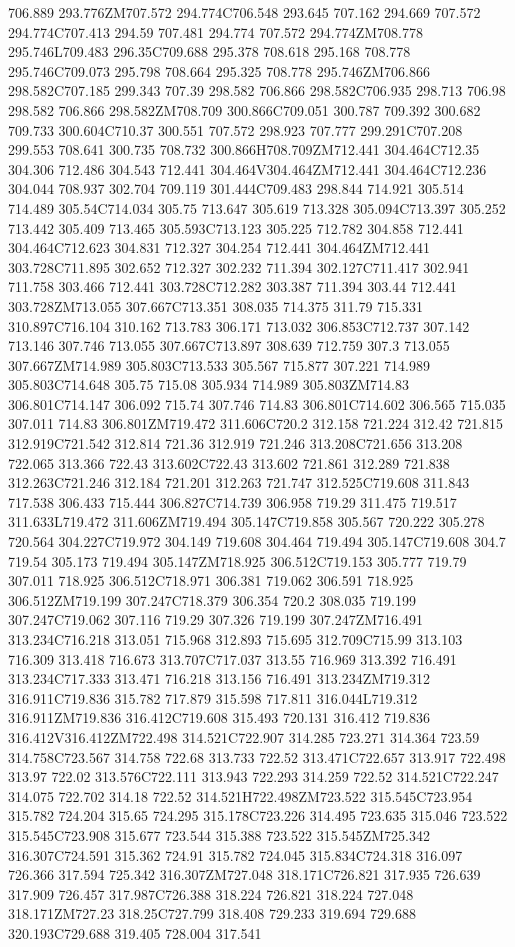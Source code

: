 706.889 293.776ZM707.572 294.774C706.548 293.645 707.162 294.669 707.572 294.774C707.413 294.59 707.481 294.774 707.572 294.774ZM708.778 295.746L709.483 296.35C709.688 295.378 708.618 295.168 708.778 295.746C709.073 295.798 708.664 295.325 708.778 295.746ZM706.866 298.582C707.185 299.343 707.39 298.582 706.866 298.582C706.935 298.713 706.98 298.582 706.866 298.582ZM708.709 300.866C709.051 300.787 709.392 300.682 709.733 300.604C710.37 300.551 707.572 298.923 707.777 299.291C707.208 299.553 708.641 300.735 708.732 300.866H708.709ZM712.441 304.464C712.35 304.306 712.486 304.543 712.441 304.464V304.464ZM712.441 304.464C712.236 304.044 708.937 302.704 709.119 301.444C709.483 298.844 714.921 305.514 714.489 305.54C714.034 305.75 713.647 305.619 713.328 305.094C713.397 305.252 713.442 305.409 713.465 305.593C713.123 305.225 712.782 304.858 712.441 304.464C712.623 304.831 712.327 304.254 712.441 304.464ZM712.441 303.728C711.895 302.652 712.327 302.232 711.394 302.127C711.417 302.941 711.758 303.466 712.441 303.728C712.282 303.387 711.394 303.44 712.441 303.728ZM713.055 307.667C713.351 308.035 714.375 311.79 715.331 310.897C716.104 310.162 713.783 306.171 713.032 306.853C712.737 307.142 713.146 307.746 713.055 307.667C713.897 308.639 712.759 307.3 713.055 307.667ZM714.989 305.803C713.533 305.567 715.877 307.221 714.989 305.803C714.648 305.75 715.08 305.934 714.989 305.803ZM714.83 306.801C714.147 306.092 715.74 307.746 714.83 306.801C714.602 306.565 715.035 307.011 714.83 306.801ZM719.472 311.606C720.2 312.158 721.224 312.42 721.815 312.919C721.542 312.814 721.36 312.919 721.246 313.208C721.656 313.208 722.065 313.366 722.43 313.602C722.43 313.602 721.861 312.289 721.838 312.263C721.246 312.184 721.201 312.263 721.747 312.525C719.608 311.843 717.538 306.433 715.444 306.827C714.739 306.958 719.29 311.475 719.517 311.633L719.472 311.606ZM719.494 305.147C719.858 305.567 720.222 305.278 720.564 304.227C719.972 304.149 719.608 304.464 719.494 305.147C719.608 304.7 719.54 305.173 719.494 305.147ZM718.925 306.512C719.153 305.777 719.79 307.011 718.925 306.512C718.971 306.381 719.062 306.591 718.925 306.512ZM719.199 307.247C718.379 306.354 720.2 308.035 719.199 307.247C719.062 307.116 719.29 307.326 719.199 307.247ZM716.491 313.234C716.218 313.051 715.968 312.893 715.695 312.709C715.99 313.103 716.309 313.418 716.673 313.707C717.037 313.55 716.969 313.392 716.491 313.234C717.333 313.471 716.218 313.156 716.491 313.234ZM719.312 316.911C719.836 315.782 717.879 315.598 717.811 316.044L719.312 316.911ZM719.836 316.412C719.608 315.493 720.131 316.412 719.836 316.412V316.412ZM722.498 314.521C722.907 314.285 723.271 314.364 723.59 314.758C723.567 314.758 722.68 313.733 722.52 313.471C722.657 313.917 722.498 313.97 722.02 313.576C722.111 313.943 722.293 314.259 722.52 314.521C722.247 314.075 722.702 314.18 722.52 314.521H722.498ZM723.522 315.545C723.954 315.782 724.204 315.65 724.295 315.178C723.226 314.495 723.635 315.046 723.522 315.545C723.908 315.677 723.544 315.388 723.522 315.545ZM725.342 316.307C724.591 315.362 724.91 315.782 724.045 315.834C724.318 316.097 726.366 317.594 725.342 316.307ZM727.048 318.171C726.821 317.935 726.639 317.909 726.457 317.987C726.388 318.224 726.821 318.224 727.048 318.171ZM727.23 318.25C727.799 318.408 729.233 319.694 729.688 320.193C729.688 319.405 728.004 317.541 